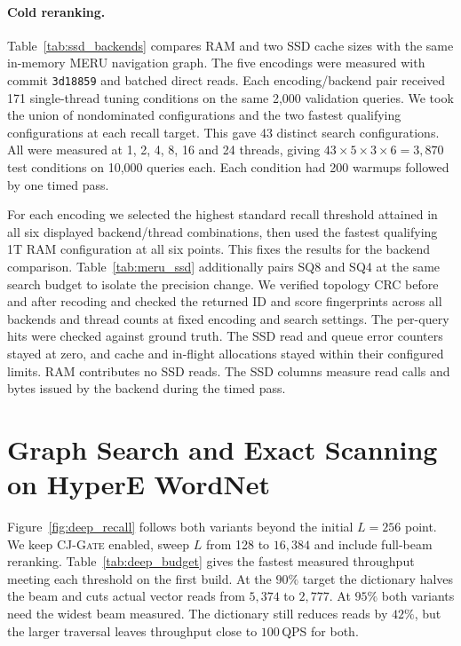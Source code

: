

\paragraph{Cold reranking.}
Table~\ref{tab:ssd_backends} compares RAM and two SSD cache sizes with the same in-memory MERU navigation graph. The five encodings were measured with commit \texttt{3d18859} and batched direct reads. Each encoding/backend pair received 171 single-thread tuning conditions on the same 2,000 validation queries. We took the union of nondominated configurations and the two fastest qualifying configurations at each recall target. This gave 43 distinct search configurations. All were measured at 1, 2, 4, 8, 16 and 24 threads, giving $43\times5\times3\times6=3{,}870$ test conditions on 10,000 queries each. Each condition had 200 warmups followed by one timed pass.

For each encoding we selected the highest standard recall threshold attained in all six displayed backend/thread combinations, then used the fastest qualifying 1T RAM configuration at all six points. This fixes the results for the backend comparison. Table~\ref{tab:meru_ssd} additionally pairs SQ8 and SQ4 at the same search budget to isolate the precision change. We verified topology CRC before and after recoding and checked the returned ID and score fingerprints across all backends and thread counts at fixed encoding and search settings. The per-query hits were checked against ground truth. The SSD read and queue error counters stayed at zero, and cache and in-flight allocations stayed within their configured limits. RAM contributes no SSD reads. The SSD columns measure read calls and bytes issued by the backend during the timed pass.



\section{Graph Search and Exact Scanning on HyperE WordNet}
\label{app:wordnet_search}

Figure~\ref{fig:deep_recall} follows both variants beyond the initial $L=256$ point. We keep \textsc{CJ-Gate} enabled, sweep $L$ from 128 to $16{,}384$ and include full-beam reranking. Table~\ref{tab:deep_budget} gives the fastest measured throughput meeting each threshold on the first build. At the $90\%$ target the dictionary halves the beam and cuts actual vector reads from $5{,}374$ to $2{,}777$. At $95\%$ both variants need the widest beam measured. The dictionary still reduces reads by $42\%$, but the larger traversal leaves throughput close to $100$\,QPS for both.

